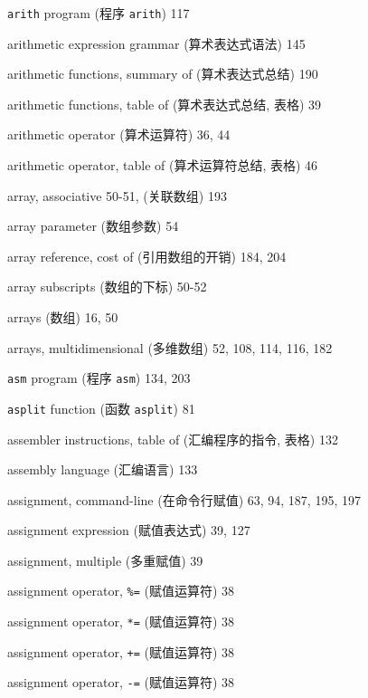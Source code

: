 \begin{multicols}{2}
\hangindent=2pc  \verb'arith' program (程序 \verb'arith') 117

\hangindent=2pc  arithmetic expression grammar (算术表达式语法) 145

\hangindent=2pc  arithmetic functions, summary of
(算术表达式总结) 190

\hangindent=2pc  arithmetic functions, table of
(算术表达式总结, 表格) 39

\hangindent=2pc  arithmetic operator (算术运算符) 36, 44

\hangindent=2pc  arithmetic operator, table of (算术运算符总结,
表格) 46

\hangindent=2pc  array, associative 50-51, (关联数组) 193

\hangindent=2pc  array parameter (数组参数) 54

\hangindent=2pc  array reference, cost of (引用数组的开销) 184, 204

\hangindent=2pc  array subscripts (数组的下标) 50-52

\hangindent=2pc  arrays (数组) 16, 50

\hangindent=2pc  arrays, multidimensional (多维数组) 52, 108, 114, 116, 182

\hangindent=2pc  \verb'asm' program (程序 \verb'asm') 134, 203

\hangindent=2pc  \verb'asplit' function (函数 \verb'asplit') 81

\hangindent=2pc  assembler instructions, table of
(汇编程序的指令, 表格) 132

\hangindent=2pc  assembly language (汇编语言) 133

\hangindent=2pc  assignment, command-line (在命令行赋值) 63, 94, 187, 195, 197

\hangindent=2pc  assignment expression (赋值表达式) 39, 127

\hangindent=2pc  assignment, multiple (多重赋值) 39

\hangindent=2pc  assignment operator, \verb'%=' (赋值运算符) 38

\hangindent=2pc  assignment operator, \verb'*=' (赋值运算符) 38

\hangindent=2pc  assignment operator, \verb'+=' (赋值运算符) 38

\hangindent=2pc  assignment operator, \verb'-=' (赋值运算符) 38


\end{multicols}

